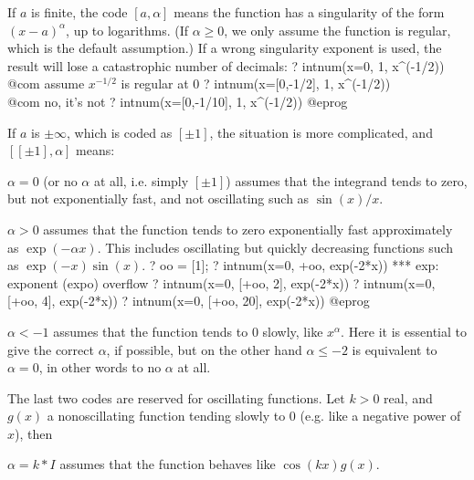 If $a$ is finite, the code $[a,\alpha]$ means the function has a
singularity of the form $(x-a)^{\alpha}$, up to logarithms. (If $\alpha \ge
0$, we only assume the function is regular, which is the default assumption.)
If a wrong singularity exponent is used, the result will lose a catastrophic
number of decimals:
\bprog
  ? intnum(x=0, 1, x^(-1/2))         \\@com assume $x^{-1/2}$ is regular at 0
  ? intnum(x=[0,-1/2], 1, x^(-1/2))  \\@com no, it's not
  ? intnum(x=[0,-1/10], 1, x^(-1/2)) 
@eprog

If $a$ is $\pm\infty$, which is coded as $[\pm 1]$, the situation is more
complicated, and $[[\pm1],\alpha]$ means:

\item $\alpha=0$ (or no $\alpha$ at all, i.e. simply $[\pm1]$) assumes that the
integrand tends to zero, but not exponentially fast, and not
oscillating such as $\sin(x)/x$.

\item $\alpha>0$ assumes that the function tends to zero exponentially fast
approximately as $\exp(-\alpha x)$. This includes oscillating but quickly
decreasing functions such as $\exp(-x)\sin(x)$.
\bprog
  ? oo = [1];
  ? intnum(x=0, +oo, exp(-2*x))
    *** exp: exponent (expo) overflow
  ? intnum(x=0, [+oo, 2], exp(-2*x))
  ? intnum(x=0, [+oo, 4], exp(-2*x))
  ? intnum(x=0, [+oo, 20], exp(-2*x))
@eprog

\item $\alpha<-1$ assumes that the function tends to $0$ slowly, like
$x^{\alpha}$. Here it is essential to give the correct $\alpha$, if possible,
but on the other hand $\alpha\le -2$ is equivalent to $\alpha=0$, in other
words to no $\alpha$ at all.

\smallskip The last two codes are reserved for oscillating functions.
Let $k > 0$ real, and $g(x)$ a nonoscillating function tending slowly to $0$
(e.g. like a negative power of $x$), then

\item $\alpha=k * I$ assumes that the function behaves like $\cos(kx)g(x)$.

